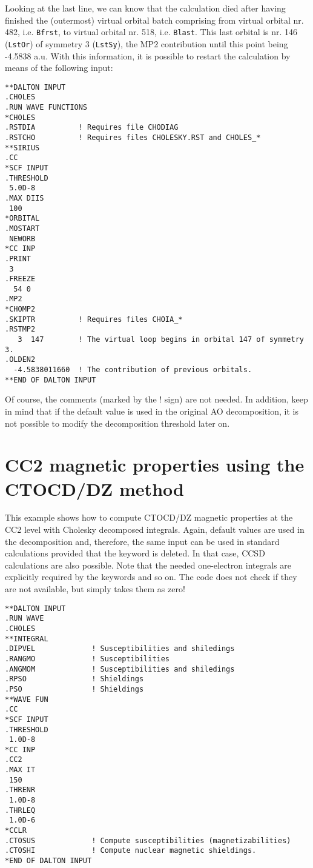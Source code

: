 Looking at the last line, we can know that the calculation died after having
finished the (outermost) virtual orbital batch comprising from virtual
orbital nr. 482, i.e. \verb|Bfrst|, to virtual orbital nr. 518, i.e.
\verb|Blast|. This last orbital is nr. 146 (\verb|LstOr|) of symmetry
3 (\verb|LstSy|), the MP2 contribution until this point being -4.5838 a.u.
With this information, it is possible to restart the calculation by means
of the following input:

\begin{verbatim}
**DALTON INPUT
.CHOLES
.RUN WAVE FUNCTIONS
*CHOLES
.RSTDIA          ! Requires file CHODIAG
.RSTCHO          ! Requires files CHOLESKY.RST and CHOLES_*
**SIRIUS
.CC
*SCF INPUT
.THRESHOLD
 5.0D-8
.MAX DIIS
 100
*ORBITAL
.MOSTART
 NEWORB
*CC INP
.PRINT
 3
.FREEZE
  54 0
.MP2
*CHOMP2
.SKIPTR          ! Requires files CHOIA_*
.RSTMP2
   3  147        ! The virtual loop begins in orbital 147 of symmetry 3.
.OLDEN2
  -4.5838011660  ! The contribution of previous orbitals.
**END OF DALTON INPUT
\end{verbatim}

Of course, the comments (marked by the ! sign) are not needed. In
addition, keep in mind that if the default value  is
used in the original AO decomposition, it is not possible to modify the
decomposition threshold later on.


\section{CC2 magnetic properties using the CTOCD/DZ method}
This example shows how to compute CTOCD/DZ magnetic properties
at the CC2 level with Cholesky decomposed integrals. Again, 
default values are used in the decomposition and, therefore, the
same input can be used in standard calculations provided that the 
keyword  is deleted. In that case, CCSD calculations 
are also possible. Note that the needed one-electron integrals
are explicitly required by the keywords  and so on.
The code does not check if they are not available, but simply
takes them as zero!

\begin{verbatim}
**DALTON INPUT
.RUN WAVE
.CHOLES
**INTEGRAL
.DIPVEL             ! Susceptibilities and shiledings
.RANGMO             ! Susceptibilities
.ANGMOM             ! Susceptibilities and shiledings
.RPSO               ! Shieldings
.PSO                ! Shieldings
**WAVE FUN
.CC
*SCF INPUT
.THRESHOLD
 1.0D-8
*CC INP
.CC2
.MAX IT
 150
.THRENR
 1.0D-8
.THRLEQ
 1.0D-6
*CCLR
.CTOSUS             ! Compute susceptibilities (magnetizabilities)
.CTOSHI             ! Compute nuclear magnetic shieldings.
*END OF DALTON INPUT
\end{verbatim}


